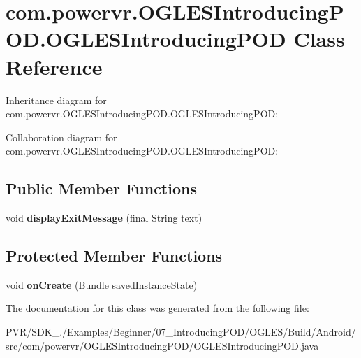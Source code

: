 \hypertarget{classcom_1_1powervr_1_1_o_g_l_e_s_introducing_p_o_d_1_1_o_g_l_e_s_introducing_p_o_d}{\section{com.\+powervr.\+O\+G\+L\+E\+S\+Introducing\+P\+O\+D.\+O\+G\+L\+E\+S\+Introducing\+P\+O\+D Class Reference}
\label{classcom_1_1powervr_1_1_o_g_l_e_s_introducing_p_o_d_1_1_o_g_l_e_s_introducing_p_o_d}
}


Inheritance diagram for com.\+powervr.\+O\+G\+L\+E\+S\+Introducing\+P\+O\+D.\+O\+G\+L\+E\+S\+Introducing\+P\+O\+D\+:


Collaboration diagram for com.\+powervr.\+O\+G\+L\+E\+S\+Introducing\+P\+O\+D.\+O\+G\+L\+E\+S\+Introducing\+P\+O\+D\+:
\subsection*{Public Member Functions}
\begin{DoxyCompactItemize}
\item 
\hypertarget{classcom_1_1powervr_1_1_o_g_l_e_s_introducing_p_o_d_1_1_o_g_l_e_s_introducing_p_o_d_a93fd52e04ef029822a56424c6301240c}{void {\bfseries display\+Exit\+Message} (final String text)}\label{classcom_1_1powervr_1_1_o_g_l_e_s_introducing_p_o_d_1_1_o_g_l_e_s_introducing_p_o_d_a93fd52e04ef029822a56424c6301240c}

\end{DoxyCompactItemize}
\subsection*{Protected Member Functions}
\begin{DoxyCompactItemize}
\item 
\hypertarget{classcom_1_1powervr_1_1_o_g_l_e_s_introducing_p_o_d_1_1_o_g_l_e_s_introducing_p_o_d_a94c8d02e0c6d8424bd5a82a5f2ab74f4}{void {\bfseries on\+Create} (Bundle saved\+Instance\+State)}\label{classcom_1_1powervr_1_1_o_g_l_e_s_introducing_p_o_d_1_1_o_g_l_e_s_introducing_p_o_d_a94c8d02e0c6d8424bd5a82a5f2ab74f4}

\end{DoxyCompactItemize}


The documentation for this class was generated from the following file\+:\begin{DoxyCompactItemize}
\item 
P\+V\+R/\+S\+D\+K\+\_./\+Examples/\+Beginner/07\+\_\+\+Introducing\+P\+O\+D/\+O\+G\+L\+E\+S/\+Build/\+Android/src/com/powervr/\+O\+G\+L\+E\+S\+Introducing\+P\+O\+D/O\+G\+L\+E\+S\+Introducing\+P\+O\+D.\+java\end{DoxyCompactItemize}
